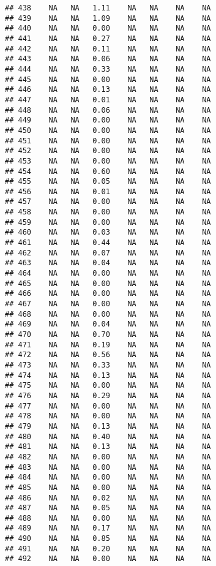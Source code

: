 \documentclass{article}\usepackage{graphicx, color}
\makeatletter
\newenvironment{kframe}{%
 \def\at@end@of@kframe{}%
 \ifinner\ifhmode%
  \def\at@end@of@kframe{\end{minipage}}%
  \begin{minipage}{\columnwidth}%
 \fi\fi%
 \def\FrameCommand##1{\hskip\@totalleftmargin \hskip-\fboxsep
 \colorbox{shadecolor}{##1}\hskip-\fboxsep
     \hskip-\linewidth \hskip-\@totalleftmargin \hskip\columnwidth}%
 \MakeFramed {\advance\hsize-\width
   \@totalleftmargin\z@ \linewidth\hsize
   \@setminipage}}%
 {\par\unskip\endMakeFramed%
 \at@end@of@kframe}
\newenvironment{knitrout}{}{} %
\makeatother
\begin{document}
\begin{knitrout}
\begin{kframe}
\begin{verbatim}
## 438    NA   NA   1.11    NA   NA    NA    NA
## 439    NA   NA   1.09    NA   NA    NA    NA
## 440    NA   NA   0.00    NA   NA    NA    NA
## 441    NA   NA   0.27    NA   NA    NA    NA
## 442    NA   NA   0.11    NA   NA    NA    NA
## 443    NA   NA   0.06    NA   NA    NA    NA
## 444    NA   NA   0.33    NA   NA    NA    NA
## 445    NA   NA   0.00    NA   NA    NA    NA
## 446    NA   NA   0.13    NA   NA    NA    NA
## 447    NA   NA   0.01    NA   NA    NA    NA
## 448    NA   NA   0.06    NA   NA    NA    NA
## 449    NA   NA   0.00    NA   NA    NA    NA
## 450    NA   NA   0.00    NA   NA    NA    NA
## 451    NA   NA   0.00    NA   NA    NA    NA
## 452    NA   NA   0.00    NA   NA    NA    NA
## 453    NA   NA   0.00    NA   NA    NA    NA
## 454    NA   NA   0.60    NA   NA    NA    NA
## 455    NA   NA   0.05    NA   NA    NA    NA
## 456    NA   NA   0.01    NA   NA    NA    NA
## 457    NA   NA   0.00    NA   NA    NA    NA
## 458    NA   NA   0.00    NA   NA    NA    NA
## 459    NA   NA   0.00    NA   NA    NA    NA
## 460    NA   NA   0.03    NA   NA    NA    NA
## 461    NA   NA   0.44    NA   NA    NA    NA
## 462    NA   NA   0.07    NA   NA    NA    NA
## 463    NA   NA   0.04    NA   NA    NA    NA
## 464    NA   NA   0.00    NA   NA    NA    NA
## 465    NA   NA   0.00    NA   NA    NA    NA
## 466    NA   NA   0.00    NA   NA    NA    NA
## 467    NA   NA   0.00    NA   NA    NA    NA
## 468    NA   NA   0.00    NA   NA    NA    NA
## 469    NA   NA   0.04    NA   NA    NA    NA
## 470    NA   NA   0.70    NA   NA    NA    NA
## 471    NA   NA   0.19    NA   NA    NA    NA
## 472    NA   NA   0.56    NA   NA    NA    NA
## 473    NA   NA   0.33    NA   NA    NA    NA
## 474    NA   NA   0.13    NA   NA    NA    NA
## 475    NA   NA   0.00    NA   NA    NA    NA
## 476    NA   NA   0.29    NA   NA    NA    NA
## 477    NA   NA   0.00    NA   NA    NA    NA
## 478    NA   NA   0.00    NA   NA    NA    NA
## 479    NA   NA   0.13    NA   NA    NA    NA
## 480    NA   NA   0.40    NA   NA    NA    NA
## 481    NA   NA   0.13    NA   NA    NA    NA
## 482    NA   NA   0.00    NA   NA    NA    NA
## 483    NA   NA   0.00    NA   NA    NA    NA
## 484    NA   NA   0.00    NA   NA    NA    NA
## 485    NA   NA   0.00    NA   NA    NA    NA
## 486    NA   NA   0.02    NA   NA    NA    NA
## 487    NA   NA   0.05    NA   NA    NA    NA
## 488    NA   NA   0.00    NA   NA    NA    NA
## 489    NA   NA   0.17    NA   NA    NA    NA
## 490    NA   NA   0.85    NA   NA    NA    NA
## 491    NA   NA   0.20    NA   NA    NA    NA
## 492    NA   NA   0.00    NA   NA    NA    NA

\end{verbatim}
\end{kframe}
\end{knitrout}
\end{document}
